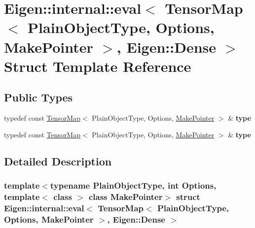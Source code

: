 \hypertarget{struct_eigen_1_1internal_1_1eval_3_01_tensor_map_3_01_plain_object_type_00_01_options_00_01_make9cc59298b6a6c512619578e17b8db3ed}{}\section{Eigen\+:\+:internal\+:\+:eval$<$ Tensor\+Map$<$ Plain\+Object\+Type, Options, Make\+Pointer $>$, Eigen\+:\+:Dense $>$ Struct Template Reference}
\label{struct_eigen_1_1internal_1_1eval_3_01_tensor_map_3_01_plain_object_type_00_01_options_00_01_make9cc59298b6a6c512619578e17b8db3ed}
\subsection*{Public Types}
\begin{DoxyCompactItemize}
\item 
\mbox{\label{struct_eigen_1_1internal_1_1eval_3_01_tensor_map_3_01_plain_object_type_00_01_options_00_01_make9cc59298b6a6c512619578e17b8db3ed_a92b61272f43afd80c1b7d01405a356fa}} 
typedef const \hyperlink{class_eigen_1_1_tensor_map}{Tensor\+Map}$<$ Plain\+Object\+Type, Options, \hyperlink{struct_eigen_1_1_make_pointer}{Make\+Pointer} $>$ \& {\bfseries type}
\item 
\mbox{\label{struct_eigen_1_1internal_1_1eval_3_01_tensor_map_3_01_plain_object_type_00_01_options_00_01_make9cc59298b6a6c512619578e17b8db3ed_a92b61272f43afd80c1b7d01405a356fa}} 
typedef const \hyperlink{class_eigen_1_1_tensor_map}{Tensor\+Map}$<$ Plain\+Object\+Type, Options, \hyperlink{struct_eigen_1_1_make_pointer}{Make\+Pointer} $>$ \& {\bfseries type}
\end{DoxyCompactItemize}


\subsection{Detailed Description}
\subsubsection*{template$<$typename Plain\+Object\+Type, int Options, template$<$ class $>$ class Make\+Pointer$>$\newline
struct Eigen\+::internal\+::eval$<$ Tensor\+Map$<$ Plain\+Object\+Type, Options, Make\+Pointer $>$, Eigen\+::\+Dense $>$}



